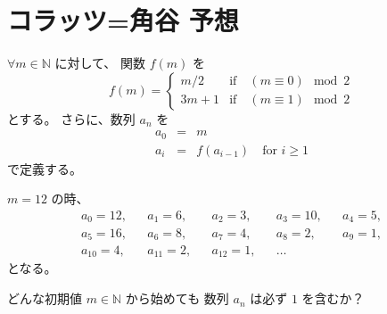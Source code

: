 
\section{コラッツ=角谷 予想}

\begin{definition}
$\forall m \in \mathbb{N}$ に対して、
関数 $f(m)$ を
\begin{equation}
f(m) =
\begin{cases}
m / 2  & \text{if} \quad (m \equiv 0) \mod 2 \\
3m + 1 & \text{if} \quad (m \equiv 1) \mod 2
\end{cases}
\end{equation}
とする。
さらに、数列 $a_n$ を
\begin{eqnarray}
a_0 &=& m \\
a_i &=& f(a_{i-1}) \quad \text{for~} i \ge 1
\end{eqnarray}
で定義する。
\end{definition}

\begin{example}
$m=12$ の時、
\begin{align}
a_0 = 12, && a_1 = 6, && a_2 = 3, && a_3 = 10, && a_4 = 5, \nonumber \\
a_5 = 16, && a_6 = 8, && a_7 = 4, && a_8 = 2,  && a_9 = 1, \nonumber \\
a_{10} = 4, && a_{11} = 2, && a_{12} = 1, && \ldots
\end{align}
となる。
\end{example}

\begin{problem}
どんな初期値 $m \in \mathbb{N}$ から始めても
数列 $a_n$ は必ず $1$ を含むか？
\end{problem}
